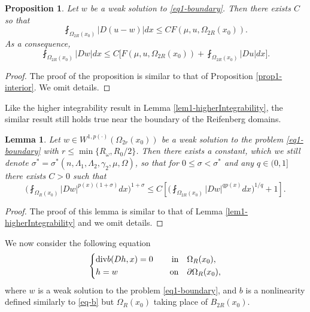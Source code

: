 \documentclass[a4paper,10pt]{amsart}
\newtheorem{lem}[thm]{Lemma}
\newtheorem{prop}[thm]{Proposition}
\newcommand{\Om}{\Omega}
\newcommand{\di}{{\rm div}}
\begin{document}
\begin{prop}
	\label{prop1-boundary}
	Let $w$ be a weak solution to \eqref{eq1-boundary}. Then there exists $C$  so that
	\begin{equation}\label{eq-Du-w-boundary}
	\fint_{\Om_{2R}(x_0)}|D(u-w)|dx\leq CF(\mu,u,\Om_{2R}(x_0)).
	\end{equation}
	As a consequence,
	\begin{equation}\label{eq-Dw-boundary}
	\fint_{\Om_{2R}(x_0)}|Dw| dx\leq C\Big[F(\mu,u,\Om_{2R}(x_0))+\fint_{\Om_{2R}(x_0)}|Du|dx\Big].
	\end{equation}
\end{prop}
\begin{proof}
	The proof of the proposition is similar to that of Proposition \ref{prop1-interior}. We omit details. 
\end{proof}


Like the higher integrability result in Lemma \ref{lem1-higherIntegrability}, the similar result still holds true near the boundary of the Reifenberg domains.

\begin{lem}\label{lem2-higherIntegrability}
	\label{lem2-higherIntegrability} Let $w\in W^{1,p(\cdot)}(\Om_{2r}(x_0))$ be a weak solution to the problem \eqref{eq1-boundary} with $r\leq \min\{R_\omega, R_0/2\}$. Then there exists a constant, which we still denote $\sigma^*=\sigma^*(n,\Lambda_1, \Lambda_2, \gamma_2, \mu, \Om)$, so that for $0\leq \sigma<\sigma^*$ and any $q\in (0,1]$ there exists $C>0$ such that
	\begin{equation}\label{eq-higherinte-boundary}
	\Big(\fint_{\Om_R(x_0)}|Dw|^{p(x)(1+\sigma)}dx\Big)^{1+\sigma}\leq C\left[\Big(\fint_{\Om_{2R}(x_0)}|Dw|^{qp(x)}dx\Big)^{1/q}+1\right].
	\end{equation}
\end{lem}
\begin{proof}
	The proof of this lemma is similar to that of Lemma \ref{lem1-higherIntegrability} and we omit details.
\end{proof}
We now consider the following equation
\begin{equation}\label{eq2-boundary}
\left\{
\begin{aligned}
&\di b(Dh, x)=0 \quad &\text{in}& \quad \Om_{R}(x_0),\\
&h=w  \quad &\text{on}& \quad \partial \Om_{R}(x_0),
\end{aligned}
\right.
\end{equation}
where $w$ is a weak solution to the problem \eqref{eq1-boundary}, and $b$ is a nonlinearity defined similarly to \eqref{eq-b} but $\Om_{R}(x_0)$ taking place of $B_{2R}(x_0)$.
\end{document}
